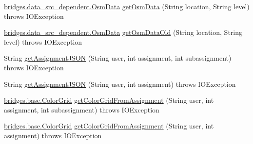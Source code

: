 \begin{DoxyCompactItemize}
\item 
\hyperlink{classbridges_1_1data__src__dependent_1_1_osm_data}{bridges.\+data\+\_\+src\+\_\+dependent.\+Osm\+Data} \hyperlink{classbridges_1_1connect_1_1_data_source_ae82f6a4feff0af28f4aae55986e1560c}{get\+Osm\+Data} (String location, String level)  throws I\+O\+Exception 
\item 
\hyperlink{classbridges_1_1data__src__dependent_1_1_osm_data}{bridges.\+data\+\_\+src\+\_\+dependent.\+Osm\+Data} \hyperlink{classbridges_1_1connect_1_1_data_source_aa6e921802c9cee6b7f87fe66f48bfec7}{get\+Osm\+Data\+Old} (String location, String level)  throws I\+O\+Exception 
\item 
String \hyperlink{classbridges_1_1connect_1_1_data_source_af2f6cd7172acb64b2ba49f134b5391f8}{get\+Assignment\+J\+S\+ON} (String user, int assignment, int subassignment)  throws I\+O\+Exception 
\item 
String \hyperlink{classbridges_1_1connect_1_1_data_source_af55c85da71b588f64ff4b46dbacab7f4}{get\+Assignment\+J\+S\+ON} (String user, int assignment)  throws I\+O\+Exception 
\item 
\hyperlink{classbridges_1_1base_1_1_color_grid}{bridges.\+base.\+Color\+Grid} \hyperlink{classbridges_1_1connect_1_1_data_source_a9556950d89b39ce61bead0879d1e2192}{get\+Color\+Grid\+From\+Assignment} (String user, int assignment, int subassignment)  throws I\+O\+Exception 
\item 
\hyperlink{classbridges_1_1base_1_1_color_grid}{bridges.\+base.\+Color\+Grid} \hyperlink{classbridges_1_1connect_1_1_data_source_ab715453b17503c73075f653326c09f44}{get\+Color\+Grid\+From\+Assignment} (String user, int assignment)  throws I\+O\+Exception 
\end{DoxyCompactItemize}
